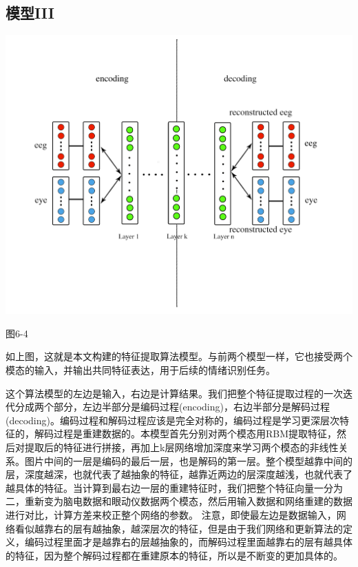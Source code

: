 	\subsection{模型III}
		\centerline{\includegraphics[width=7in]{figure/feature_learning.png}}
		\centerline{图6-4}
		
		如上图，这就是本文构建的特征提取算法模型。与前两个模型一样，它也接受两个模态的输入，并输出共同特征表达，用于后续的情绪识别任务。
		
		这个算法模型的左边是输入，右边是计算结果。我们把整个特征提取过程的一次迭代分成两个部分，左边半部分是编码过程(encoding)，右边半部分是解码过程(decoding)。编码过程和解码过程应该是完全对称的，编码过程是学习更深层次特征的，解码过程是重建数据的。本模型首先分别对两个模态用RBM提取特征，然后对提取后的特征进行拼接，再加上k层网络增加深度来学习两个模态的非线性关系。图片中间的一层是编码的最后一层，也是解码的第一层。整个模型越靠中间的层，深度越深，也就代表了越抽象的特征，越靠近两边的层深度越浅，也就代表了越具体的特征。当计算到最右边一层的重建特征时，我们把整个特征向量一分为二，重新变为脑电数据和眼动仪数据两个模态，然后用输入数据和网络重建的数据进行对比，计算方差来校正整个网络的参数。 注意，即使最左边是数据输入，网络看似越靠右的层有越抽象，越深层次的特征，但是由于我们网络和更新算法的定义，编码过程里面才是越靠右的层越抽象的，而解码过程里面越靠右的层有越具体的特征，因为整个解码过程都在重建原本的特征，所以是不断变的更加具体的。
		
